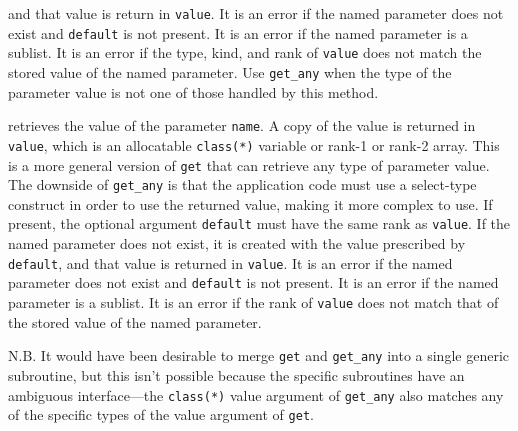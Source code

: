 \documentclass[11pt]{article}
\begin{document}
\begin{description}[style=nextline]
  and that value is return in \texttt{value}.  It is an error if the named
  parameter does not exist and \texttt{default} is not present.  It is an
  error if the named parameter is a sublist. It is an error if the type, kind,
  and rank of \texttt{value} does not match the stored value of the named
  parameter.  Use \texttt{get_any} when the type of the parameter value is not
  one of those handled by this method.
\item[\texttt{get_any(name, value \Lbr,default\Rbr\ \Lbr,stat \Lbr,errmsg\Rbr\Rbr)}]
  retrieves the value of the parameter \texttt{name}.  A copy of the value is
  returned in \texttt{value}, which is an allocatable \texttt{class(*)} variable
  or rank-1 or rank-2 array.  This is a more general version of \texttt{get} that can
  retrieve any type of parameter value.  The downside of \texttt{get_any} is
  that the application code must use a select-type construct in order to use
  the returned value, making it more complex to use.  If present, the optional
  argument \texttt{default} must have the same rank as \texttt{value}.  If the
  named parameter does not exist, it is created with the value prescribed by
  \texttt{default}, and that value is returned in \texttt{value}.  It is an
  error if the named parameter does not exist and \texttt{default} is not
  present.  It is an error if the named parameter is a sublist.  It is an
  error if the rank of \texttt{value} does not match that of the stored value
  of the named parameter. \par
  N.B. It would have been desirable to merge \texttt{get} and \texttt{get_any}
  into a single generic subroutine, but this isn't possible because the
  specific subroutines have an ambiguous interface---the \texttt{class(*)}
  value argument of \texttt{get_any} also matches any of the specific types
  of the value argument of \texttt{get}.
\end{description}
\end{document}
